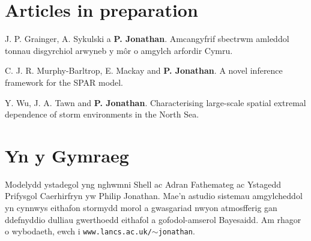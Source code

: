 \documentclass[11pt,a4paper]{moderncv}
\begin{document}
\setlength{\parskip}{0em}

\section{Articles in preparation}

\setlength{\parskip}{0.5em}

J. P. Grainger, A. Sykulski a \textbf{P. Jonathan}. Amcangyfrif sbectrwm amleddol tonnau disgyrchiol arwyneb y m\^or o amgylch arfordir Cymru.

C. J. R. Murphy-Barltrop, E. Mackay and \textbf{P. Jonathan}. A novel inference framework for the SPAR model.

Y. Wu, J. A. Tawn and \textbf{P. Jonathan}. Characterising large-scale spatial extremal dependence of storm environments in the North Sea.

\setlength{\parskip}{0em}

\section{Yn y Gymraeg}
Modelydd ystadegol yng nghwmni Shell ac Adran Fathemateg ac Ystagedd Prifysgol Caerhirfryn yw Philip Jonathan. Mae'n astudio sistemau amgylcheddol yn cynnwys eithafon stormydd morol a gwasgariad nwyon atmosfferig gan ddefnyddio dulliau gwerthoedd eithafol a gofodol-amserol Bayesaidd. Am rhagor o wybodaeth, ewch i \texttt{www.lancs.ac.uk/$\sim$jonathan}.

\clearpage
\end{document}
